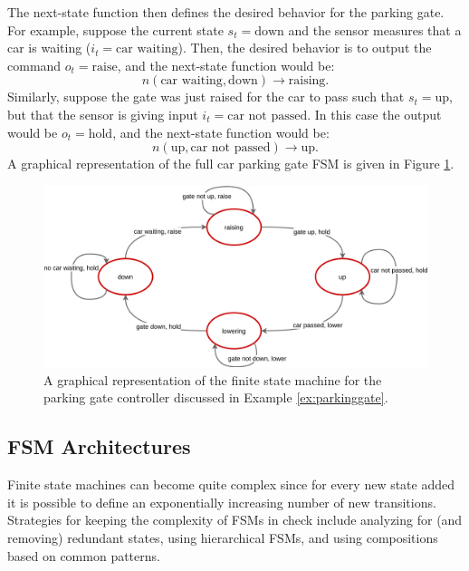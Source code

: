 \begin{example}
The next-state function then defines the desired behavior for the parking gate. For example, suppose the current state $s_t = \text{down}$ and the sensor measures that a car is waiting ($i_t = \text{car waiting}$). Then, the desired behavior is to output the command $o_t = \text{raise}$, and the next-state function would be:
\begin{equation*}
    n(\text{car waiting}, \text{down}) \xrightarrow{} \text{raising}.
\end{equation*}
Similarly, suppose the gate was just raised for the car to pass such that $s_t = \text{up}$, but that the sensor is giving input $i_t = \text{car not passed}$. In this case the output would be $o_t = \text{hold}$, and the next-state function would be:
\begin{equation*}
    n(\text{up}, \text{car not passed}) \xrightarrow{} \text{up}.
\end{equation*}
A graphical representation of the full car parking gate FSM is given in Figure \ref{fig:parkinggate}.
\begin{figure}[ht]
    \centering
    \includegraphics[width=1\textwidth]{tex/figs/ch21_figs/parkinggate_fsm.png}
    \caption{A graphical representation of the finite state machine for the parking gate controller discussed in Example \ref{ex:parkinggate}.}
    \label{fig:parkinggate}
\end{figure}
\end{example}

\subsection{FSM Architectures}
Finite state machines can become quite complex since for every new state added it is possible to define an exponentially increasing number of new transitions. Strategies for keeping the complexity of FSMs in check include analyzing for (and removing) redundant states, using hierarchical FSMs, and using compositions based on common patterns.

